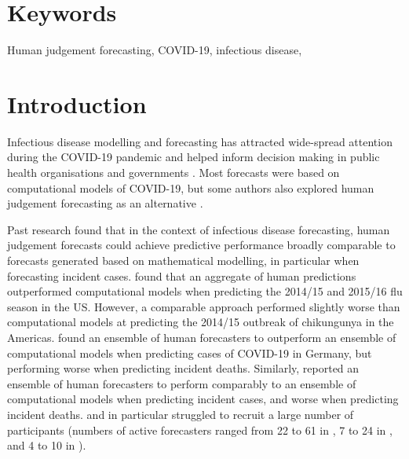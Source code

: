 \documentclass[10pt,a4paper,twocolumn]{article}
\begin{document}
\section*{Keywords}

Human judgement forecasting, COVID-19, infectious disease, 



\clearpage

\section*{Introduction}

Infectious disease modelling and forecasting has attracted wide-spread attention during the COVID-19 pandemic and helped inform decision making in public health organisations and governments \cite{cramerEvaluationIndividualEnsemble2021, venkatramananUtilityHumanJudgment2022}. 
Most forecasts were based on computational models of COVID-19, but some authors also explored human judgement forecasting as an alternative \cite{recchiaHowWellDid2021, mcandrewExpertJudgmentModel2022, bosseComparingHumanModelbased2022, mcandrewChimericForecastingCombining2022}. 

Past research found that in the context of infectious disease forecasting, human judgement forecasts could achieve predictive performance broadly comparable to forecasts generated based on mathematical modelling, in particular when forecasting incident cases. \citet{farrowHumanJudgmentApproach2017} found that an aggregate of human predictions outperformed computational models when predicting the 2014/15 and 2015/16 flu season in the US. However, a comparable approach performed slightly worse than computational models at predicting the 2014/15 outbreak of chikungunya in the Americas. 
\citet{bosseComparingHumanModelbased2022} found an ensemble of human forecasters to outperform an ensemble of computational models when predicting cases of COVID-19 in Germany, but performing worse when predicting incident deaths. Similarly, \citet{mcandrewChimericForecastingCombining2022} reported an ensemble of human forecasters to perform comparably to an ensemble of computational models when predicting incident cases, and worse when predicting incident deaths. \citet{farrowHumanJudgmentApproach2017} and in particular \citet{bosseComparingHumanModelbased2022} struggled to recruit a large number of participants (numbers of active forecasters ranged from 22 to 61 in \citet{mcandrewChimericForecastingCombining2022}, 7 to 24 in \citet{farrowHumanJudgmentApproach2017}, and 4 to 10 in \citet{bosseComparingHumanModelbased2022}). 
\end{document}
